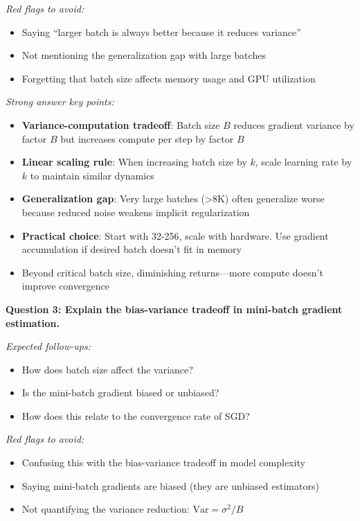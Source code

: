 \documentclass[../../main.tex]{subfiles}
\begin{document}
\begin{interviewquestions}
\textit{Red flags to avoid:}
\begin{itemize}
    \item Saying ``larger batch is always better because it reduces variance''
    \item Not mentioning the generalization gap with large batches
    \item Forgetting that batch size affects memory usage and GPU utilization
\end{itemize}

\textit{Strong answer key points:}
\begin{itemize}
    \item \textbf{Variance-computation tradeoff}: Batch size $B$ reduces gradient variance by factor $B$ but increases compute per step by factor $B$
    \item \textbf{Linear scaling rule}: When increasing batch size by $k$, scale learning rate by $k$ to maintain similar dynamics
    \item \textbf{Generalization gap}: Very large batches (>8K) often generalize worse because reduced noise weakens implicit regularization
    \item \textbf{Practical choice}: Start with 32-256, scale with hardware. Use gradient accumulation if desired batch doesn't fit in memory
    \item Beyond critical batch size, diminishing returns---more compute doesn't improve convergence
\end{itemize}

\vspace{0.5em}
\textbf{Question 3: Explain the bias-variance tradeoff in mini-batch gradient estimation.}

\textit{Expected follow-ups:}
\begin{itemize}
    \item How does batch size affect the variance?
    \item Is the mini-batch gradient biased or unbiased?
    \item How does this relate to the convergence rate of SGD?
\end{itemize}

\textit{Red flags to avoid:}
\begin{itemize}
    \item Confusing this with the bias-variance tradeoff in model complexity
    \item Saying mini-batch gradients are biased (they are unbiased estimators)
    \item Not quantifying the variance reduction: $\text{Var} = \sigma^2/B$
\end{itemize}


\end{interviewquestions}
\end{document}
